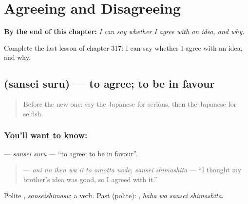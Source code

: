 
\chapter{Agreeing and Disagreeing}
\label{ch:ja-agreeing-and-disagreeing}

\begin{chapteropening}
\textbf{By the end of this chapter:} \emph{I can say whether I agree with an idea, and why.}

Complete the last lesson of chapter 317: I can say whether I agree with an idea, and why.
\end{chapteropening}

\section[\texorpdfstring{\ja{さんせいする} (sansei suru)}{さんせいする (sansei suru)}]{ (sansei suru) — to agree; to be in favour}

\label{lesson:JA-C317-sansei-suru}



\begin{quote}
Before the new one: say the Japanese for serious, then the Japanese for selfish.
\end{quote}

\subsection*{You'll want to know: }
\textbf{} — \emph{sansei suru} — \textquotedblleft{}to agree; to be in favour\textquotedblright{}.

\begin{quote}
\textbf{   } — \emph{ani no iken wa ii to omotta node, sansei shimashita} — \textquotedblleft{}I thought my brother's idea was good, so I agreed with it.\textquotedblright{}
\end{quote}

Polite \textbf{}, \emph{sanseishimasu}; a  verb. Past (polite): \textbf{ }, \emph{haha wa sansei shimashita}.

